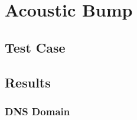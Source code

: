 \section{Acoustic Bump}

\subsection{Test Case}



\subsection{Results}

\subsubsection{DNS Domain}




